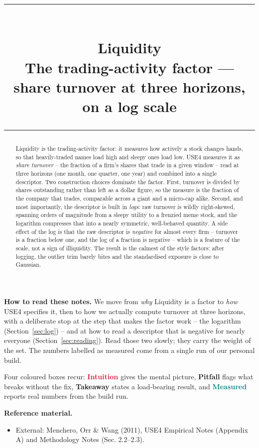 \documentclass[11pt]{article}
\title{\vspace{-2.2em}
  {\color{steel}\rule{\textwidth}{1.3pt}}\\[0.7em]
  \Huge\bfseries Liquidity\\[0.35em]
  \large\mdseries The trading-activity factor --- share turnover at three horizons, on a log scale\\[0.4em]
  {\color{steel}\rule{\textwidth}{0.7pt}}}
\author{}
\date{}
\theoremstyle{definition}
\theoremstyle{plain}
\theoremstyle{remark}
\begin{document}
\maketitle
\thispagestyle{empty}

\begin{abstract}
Liquidity is the trading-activity factor: it measures how actively a stock changes hands, so that heavily-traded names load high and sleepy ones load low. USE4 measures it as \emph{share turnover} -- the fraction of a firm's shares that trade in a given window -- read at three horizons (one month, one quarter, one year) and combined into a single descriptor. Two construction choices dominate the factor. First, turnover is divided by shares outstanding rather than left as a dollar figure, so the measure is the fraction of the company that trades, comparable across a giant and a micro-cap alike. Second, and most importantly, the descriptor is built in \emph{logs}: raw turnover is wildly right-skewed, spanning orders of magnitude from a sleepy utility to a frenzied meme stock, and the logarithm compresses that into a nearly symmetric, well-behaved quantity. A side effect of the log is that the raw descriptor is \emph{negative} for almost every firm -- turnover is a fraction below one, and the log of a fraction is negative -- which is a feature of the scale, not a sign of illiquidity. The result is the calmest of the style factors: after logging, the outlier trim barely bites and the standardised exposure is close to Gaussian.
\end{abstract}

\begin{tcolorbox}[colback=paperlt,colframe=ink!30,boxrule=0.4pt,arc=2pt,left=10pt,right=10pt,top=8pt,bottom=8pt]
\textbf{How to read these notes.} We move from \emph{why} Liquidity is a factor to \emph{how} USE4 specifies it, then to how we actually compute turnover at three horizons, with a deliberate stop at the step that makes the factor work -- the logarithm (Section~\ref{sec:log}) -- and at how to read a descriptor that is negative for nearly everyone (Section~\ref{sec:reading}). Read those two slowly; they carry the weight of the set. The numbers labelled as measured come from a single run of our personal build.

\smallskip
Four coloured boxes recur: \textcolor{crimson}{\textbf{Intuition}} gives the mental picture, \textcolor{amber}{\textbf{Pitfall}} flags what breaks without the fix, \textcolor{steel}{\textbf{Takeaway}} states a load-bearing result, and \textcolor{teal}{\textbf{Measured}} reports real numbers from the build run.

\smallskip
\textbf{Reference material.}
\begin{itemize}[leftmargin=1.4em,topsep=2pt]
  \item External: Menchero, Orr \& Wang (2011), USE4 Empirical Notes (Appendix A) and Methodology Notes (Sec. 2.2--2.3).
\end{itemize}
\end{tcolorbox}
\end{document}
